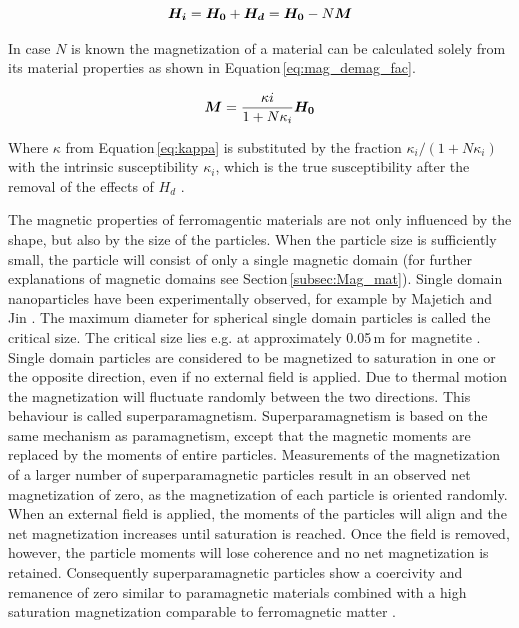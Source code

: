 \begin{equation}
\label{eq:int_field}
\centering
\boldsymbol{H_{i}} = \boldsymbol{H_{0}} + \boldsymbol{H_{d}} = \boldsymbol{H_{0}} - N\boldsymbol{M}
\end{equation}

In case $N$ is known the magnetization of a material can be calculated solely from its material properties as shown in Equation\,\ref{eq:mag_demag_fac}. 

\begin{equation}
\label{eq:mag_demag_fac}
\centering
\boldsymbol{M} = \frac{\kappa{i}}{1+N\kappa_{i}}\boldsymbol{H_{0}}
\end{equation}

Where $\kappa$ from Equation\,\ref{eq:kappa} is substituted by the fraction $\kappa_{i}/(1+N\kappa_{i})$ with the intrinsic susceptibility $\kappa_{i}$, which is the true susceptibility after the removal of the effects of $H_{d}$ \cite{FranzrebHabil,svoboda2004magnetic}.
 
The magnetic properties of ferromagentic materials are not only influenced by the shape, but also by the size of the particles. When the particle size is sufficiently small, the particle will consist of only a single magnetic domain (for further explanations of magnetic domains see Section\,\ref{subsec:Mag_mat}). Single domain nanoparticles have been experimentally observed, for example by Majetich and Jin \cite{majetich1999magnetization}. The maximum diameter for spherical single domain particles is called the critical size. The critical size lies e.g. at approximately 0.05\,\textmu m for magnetite \cite{svoboda2004magnetic,butler1975theoretical}. Single domain particles are considered to be magnetized to saturation in one or the opposite direction, even if no external field is applied. Due to thermal motion the magnetization will fluctuate randomly between the two directions. This behaviour is called superparamagnetism.
Superparamagnetism is based on the same mechanism as paramagnetism, except that the magnetic moments are replaced by the moments of entire particles. Measurements of the magnetization of a larger number of superparamagnetic particles result in an observed net magnetization of zero, as the magnetization of each particle is oriented randomly. When an external field is applied, the moments of the particles will align and the net magnetization increases until saturation is reached. Once the field is removed, however, the particle moments will lose coherence and no net magnetization is retained. Consequently superparamagnetic particles show a coercivity and remanence of zero similar to paramagnetic materials combined with a high saturation magnetization comparable to ferromagnetic matter \cite{svoboda2004magnetic,FranzrebHabil}.      
    
